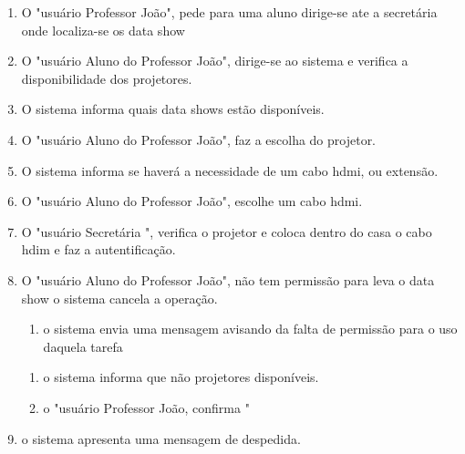 \begin{enumerate}

  \item O "usuário Professor João", pede para uma aluno dirige-se ate a
    secretária onde localiza-se os data show 
  
  \item O "usuário Aluno do Professor João", dirige-se ao sistema e verifica a
    disponibilidade dos projetores.  

  \item O sistema informa quais data shows estão disponíveis. 

  \item O "usuário Aluno do Professor João", faz a escolha do projetor.

  \item O sistema informa se haverá a necessidade de um cabo hdmi, ou extensão.

  \item O "usuário Aluno do Professor João", escolhe um cabo hdmi.

  \item O "usuário Secretária ", verifica o projetor e coloca dentro do casa o
    cabo hdim e faz a autentificação.

  \item O "usuário Aluno do Professor João", não tem permissão para leva o data
    show o sistema cancela a operação.

    \begin{enumerate}

      \item o sistema envia uma mensagem avisando da falta de permissão para o
        uso daquela tarefa
    
    \end{enumerate}

    
    \begin{enumerate}
  
      \item o sistema informa que não projetores disponíveis.
        
      \item o "usuário Professor João, confirma "

    \end{enumerate}
    
  \item o sistema apresenta uma mensagem de despedida. 
 

\end{enumerate}


\newpage

